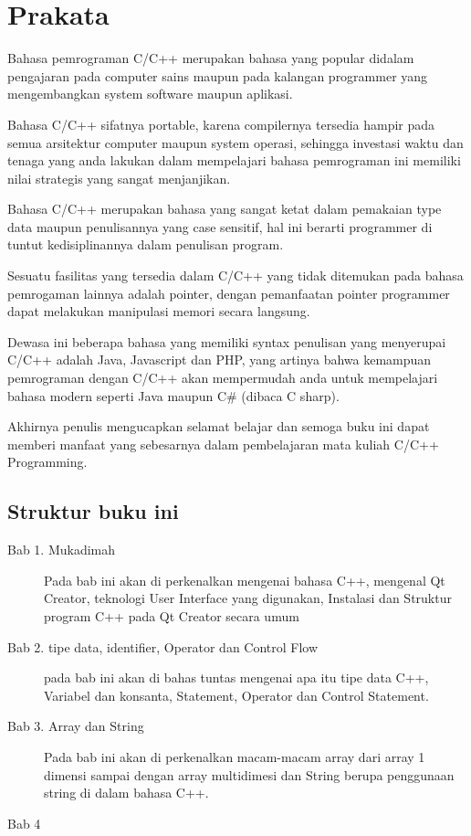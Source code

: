 \chapter*{Prakata}\label{prakata}

Bahasa pemrograman C/C++ merupakan bahasa yang popular didalam
pengajaran pada computer sains maupun pada kalangan programmer yang
mengembangkan system software maupun aplikasi.

Bahasa C/C++ sifatnya portable, karena compilernya tersedia hampir pada
semua arsitektur computer maupun system operasi, sehingga investasi
waktu dan tenaga yang anda lakukan dalam mempelajari bahasa pemrograman
ini memiliki nilai strategis yang sangat menjanjikan.

Bahasa C/C++ merupakan bahasa yang sangat ketat dalam pemakaian type
data maupun penulisannya yang case sensitif, hal ini berarti programmer
di tuntut kedisiplinannya dalam penulisan program.

Sesuatu fasilitas yang tersedia dalam C/C++ yang tidak ditemukan pada
bahasa pemrogaman lainnya adalah pointer, dengan pemanfaatan pointer
programmer dapat melakukan manipulasi memori secara langsung.

Dewasa ini beberapa bahasa yang memiliki syntax penulisan yang
menyerupai C/C++ adalah Java, Javascript dan PHP, yang artinya bahwa
kemampuan pemrograman dengan C/C++ akan mempermudah anda untuk
mempelajari bahasa modern seperti Java maupun C\# (dibaca C sharp).

Akhirnya penulis mengucapkan selamat belajar dan semoga buku ini dapat
memberi manfaat yang sebesarnya dalam pembelajaran mata kuliah C/C++
Programming.

\section{Struktur buku ini}

\begin{description}
	\item[Bab 1. Mukadimah] Pada bab ini akan di perkenalkan mengenai bahasa C++, mengenal Qt Creator, teknologi User Interface yang digunakan, Instalasi dan Struktur program C++ pada Qt Creator secara umum 
	\item[Bab 2. tipe data, identifier, Operator dan Control Flow] pada bab ini akan di bahas tuntas mengenai apa itu tipe data C++, Variabel dan konsanta, Statement, Operator dan Control Statement.
	\item[Bab 3. Array dan String] Pada bab ini akan di perkenalkan macam-macam array dari array 1 dimensi sampai dengan array multidimesi dan String berupa penggunaan string di dalam bahasa C++.
	\item[Bab 4] 
\end{description}